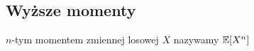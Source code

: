 \subsection{Wyższe momenty}
\begin{definition}
\(n\)-tym momentem zmiennej losowej \( X \) nazywamy \( \expected{X^n} \)
\end{definition}
